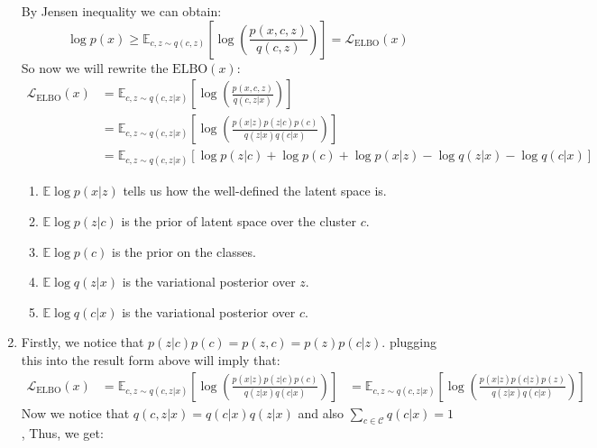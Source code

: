 \documentclass{article}
\begin{document}
\begin{enumerate}
    By Jensen inequality we can obtain:
    \begin{equation*}
        \log p(x) \geq \mathbb{E}_{c, z \sim q(c, z)} \left[ \log \left( \frac{p(x, c, z)}{q(c, z)} \right) \right] = \mathcal{L}_{\mathrm{ELBO}}(x)
    \end{equation*}
    So now we will rewrite the $\mathrm{ELBO}(x)$:
    \begin{equation*}
        \begin{aligned}
        \mathcal{L}_{\mathrm{ELBO}}(x) &= \mathbb{E}_{c, z \sim q(c, z|x)} \left[ \log \left( \frac{p(x,c,z)}{q(c,z|x)} \right) \right] \\
        &= \mathbb{E}_{c, z \sim q(c, z|x)} \left[ \log \left( \frac{p(x|z) p(z|c) p(c)}{q(z|x) q(c|x)} \right) \right] \\
        &= \mathbb{E}_{c, z \sim q(c, z|x)} \left[ \log p(z|c) + \log p(c) + \log p(x|z) - \log q(z|x) - \log q(c|x) \right]
        \end{aligned}
    \end{equation*}
    \begin{enumerate}
        \item $\mathbb{E} \log p(x|z)$ tells us how the well-defined the latent space is.
        \item $\mathbb{E} \log p(z|c)$ is the prior of latent space over the cluster $c$.
        \item $\mathbb{E} \log p(c)$ is the prior on the classes.
        \item $\mathbb{E} \log q(z|x)$ is the variational posterior over $z$.
        \item $\mathbb{E} \log q(c|x)$ is the variational posterior over $c$.
    \end{enumerate}
    \item Firstly, we notice that $p(z|c) p(c) = p(z,c) = p(z) p(c|z)$. plugging this into the result form above will imply that:
    \begin{equation*}
        \begin{aligned}
        \mathcal{L}_{\mathrm{ELBO}}(x) &= 
        \mathbb{E}_{c, z \sim q(c, z|x)} \left[ \log \left( \frac{p(x|z) p(z|c) p(c)}{q(z|x) q(c|x)} \right) \right] 
        &= \mathbb{E}_{c, z \sim q(c, z|x)} \left[ \log \left( \frac{p(x|z) p(c|z) p(z)}{q(z|x) q(c|x)} \right) \right]
        \end{aligned}
    \end{equation*}
    Now we notice that $q(c,z|x) = q(c|x) q(z|x)$ and also $\sum_{c \in \mathcal{C}} q(c|x) = 1$, Thus, we get:

\end{enumerate}
\end{document}
